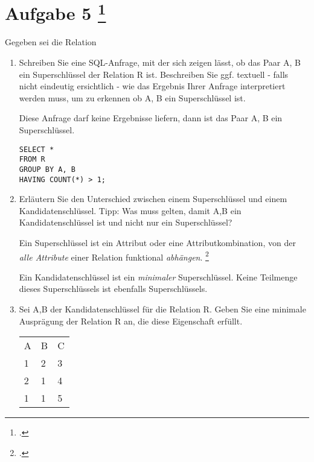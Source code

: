 \documentclass{lehramt-informatik-aufgabe}
\begin{document}
\section{Aufgabe 5
\footcite{examen:66116:2020:03}}

Gegeben sei die Relation 

\begin{enumerate}
\item Schreiben Sie eine SQL-Anfrage, mit der sich zeigen lässt, ob das
Paar A, B ein Superschlüssel der Relation R ist. Beschreiben Sie ggf.
textuell - falls nicht eindeutig ersichtlich - wie das Ergebnis Ihrer
Anfrage interpretiert werden muss, um zu erkennen ob A, B ein
Superschlüssel ist.

\begin{liAntwort}
Diese Anfrage darf keine Ergebnisse liefern, dann ist das Paar A, B ein
Superschlüssel.
\begin{verbatim}
SELECT *
FROM R
GROUP BY A, B
HAVING COUNT(*) > 1;
\end{verbatim}
\end{liAntwort}

\item Erläutern Sie den Unterschied zwischen einem Superschlüssel und
einem Kandidatenschlüssel. Tipp: Was muss gelten, damit A,B ein
Kandidatenschlüssel ist und nicht nur ein Superschlüssel?

\begin{liAntwort}
Ein Superschlüssel ist ein Attribut oder
eine Attributkombination, von der \emph{alle Attribute} einer Relation
funktional \emph{abhängen}.
\footcite[Seite 181 Kapitel 6.2 „Superschlüssel“]{kemper}

Ein Kandidatenschlüssel ist ein \emph{minimaler} Superschlüssel. Keine
Teilmenge dieses Superschlüssels ist ebenfalls Superschlüssels.

\end{liAntwort}

\item Sei A,B der Kandidatenschlüssel für die Relation R. Geben Sie eine
minimale Ausprägung der Relation R an, die diese Eigenschaft erfüllt.

\begin{liAntwort}
\begin{tabular}{lll}
A & B & C \\
1 & 2 & 3 \\
2 & 1 & 4 \\
1 & 1 & 5 \\
\end{tabular}
\end{liAntwort}

\end{enumerate}
\end{document}
